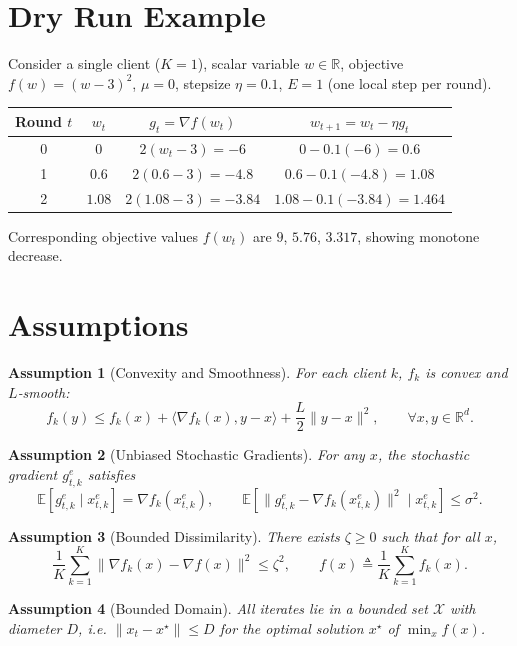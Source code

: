\documentclass{article}
\newtheorem{assumption}{Assumption}
\newcommand{\E}{\mathbb{E}}
\newcommand{\R}{\mathbb{R}}
\begin{document}
\section*{Dry Run Example}
Consider a single client ($K=1$), scalar variable $w\in\R$, objective $f(w)=(w-3)^2$, $\mu=0$, stepsize $\eta=0.1$, $E=1$ (one local step per round).

\begin{center}
\begin{tabular}{c|c|c|c}
Round $t$ & $w_t$ & $g_t=\nabla f(w_t)$ & $w_{t+1}=w_t-\eta g_t$ \\ \hline
0 & $0$ & $2(w_t-3)=-6$ & $0-0.1(-6)=0.6$ \\
1 & $0.6$ & $2(0.6-3)=-4.8$ & $0.6-0.1(-4.8)=1.08$ \\
2 & $1.08$ & $2(1.08-3)=-3.84$ & $1.08-0.1(-3.84)=1.464$ \\
\end{tabular}
\end{center}
Corresponding objective values $f(w_t)$ are $9$, $5.76$, $3.317$, showing monotone decrease.

\section*{Assumptions}
\begin{assumption}[Convexity and Smoothness]\label{as:convex}
For each client $k$, $f_k$ is convex and $L$‑smooth:
\[
    f_k(y)\le f_k(x)+\langle\nabla f_k(x),y-x\rangle+\frac{L}{2}\|y-x\|^2,
    \qquad\forall x,y\in\R^d .
\]
\end{assumption}
\begin{assumption}[Unbiased Stochastic Gradients]\label{as:unbiased}
For any $x$, the stochastic gradient $g_{t,k}^{e}$ satisfies
\[
    \E\!\left[g_{t,k}^{e}\mid x_{t,k}^{e}\right]=\nabla f_k(x_{t,k}^{e}),\qquad
    \E\!\left[\|g_{t,k}^{e}-\nabla f_k(x_{t,k}^{e})\|^2\mid x_{t,k}^{e}\right]\le\sigma^2 .
\]
\end{assumption}
\begin{assumption}[Bounded Dissimilarity]\label{as:dissimilarity}
There exists $\zeta\ge0$ such that for all $x$,
\[
    \frac{1}{K}\sum_{k=1}^{K}\|\nabla f_k(x)-\nabla f(x)\|^2\le\zeta^2,
    \qquad f(x)\triangleq\frac1K\sum_{k=1}^{K}f_k(x).
\]
\end{assumption}
\begin{assumption}[Bounded Domain]\label{as:bounded}
All iterates lie in a bounded set $\mathcal{X}$ with diameter $D$, i.e.
$\|x_t-x^\star\|\le D$ for the optimal solution $x^\star$ of $\min_x f(x)$.
\end{assumption}
\end{document}
